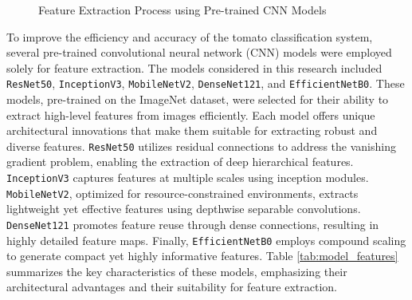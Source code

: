 \documentclass[12pt,a4paper]{report}
\begin{document}
	
	\begin{figure}[h]
		\renewcommand\thefigure{3.3}
		\centering
		\caption{Feature Extraction Process using Pre-trained CNN Models}
		\label{fig:feature_extraction}
	\end{figure}
	
\hspace{1cm}	To improve the efficiency and accuracy of the tomato classification system, several pre-trained convolutional neural network (CNN) models were employed solely for feature extraction. The models considered in this research included \texttt{ResNet50}\cite{ref8}, \texttt{InceptionV3}\cite{ref9}, \texttt{MobileNetV2}\cite{ref10}, \texttt{DenseNet121}\cite{ref11}, and \texttt{EfficientNetB0}\cite{ref12}. These models, pre-trained on the ImageNet dataset, were selected for their ability to extract high-level features from images efficiently. Each model offers unique architectural innovations that make them suitable for extracting robust and diverse features. \texttt{ResNet50} utilizes residual connections to address the vanishing gradient problem, enabling the extraction of deep hierarchical features. \texttt{InceptionV3} captures features at multiple scales using inception modules. \texttt{MobileNetV2}, optimized for resource-constrained environments, extracts lightweight yet effective features using depthwise separable convolutions. \texttt{DenseNet121} promotes feature reuse through dense connections, resulting in highly detailed feature maps. Finally, \texttt{EfficientNetB0} employs compound scaling to generate compact yet highly informative features. Table \ref{tab:model_features} summarizes the key characteristics of these models, emphasizing their architectural advantages and their suitability for feature extraction.
	
\end{document}
